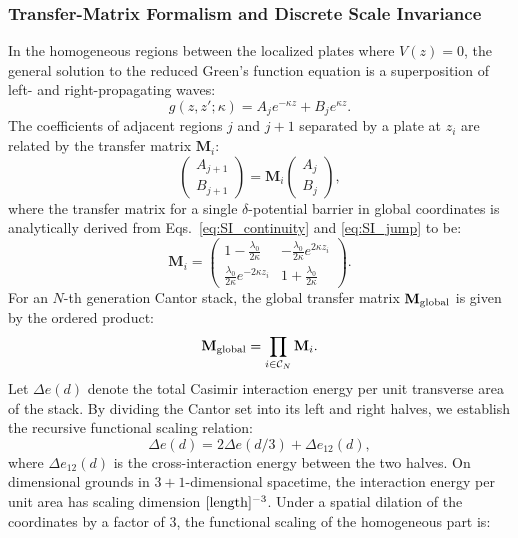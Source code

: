 \documentclass[12pt,letterpaper]{article}
\begin{document}
\subsubsection{Transfer-Matrix Formalism and Discrete Scale Invariance}
In the homogeneous regions between the localized plates where $V(z) = 0$, the general solution to the reduced Green's function equation is a superposition of left- and right-propagating waves:
\begin{equation}
g(z, z'; \kappa) = A_j e^{-\kappa z} + B_j e^{\kappa z}.
\label{eq:SI_wave}
\end{equation}
The coefficients of adjacent regions $j$ and $j+1$ separated by a plate at $z_i$ are related by the transfer matrix $\mathbf{M}_i$:
\begin{equation}
\begin{pmatrix} A_{j+1} \\ B_{j+1} \end{pmatrix} = \mathbf{M}_i \begin{pmatrix} A_j \\ B_j \end{pmatrix},
\label{eq:SI_transfer}
\end{equation}
where the transfer matrix for a single $\delta$-potential barrier in global coordinates is analytically derived from Eqs.~\eqref{eq:SI_continuity} and \eqref{eq:SI_jump} to be:
\begin{equation}
\mathbf{M}_i = \begin{pmatrix} 1 - \frac{\lambda_0}{2\kappa} & -\frac{\lambda_0}{2\kappa} e^{2\kappa z_i} \\ \frac{\lambda_0}{2\kappa} e^{-2\kappa z_i} & 1 + \frac{\lambda_0}{2\kappa} \end{pmatrix}.
\label{eq:SI_matrix}
\end{equation}
For an $N$-th generation Cantor stack, the global transfer matrix $\mathbf{M}_{\rm global}$ is given by the ordered product:
\begin{equation}
\mathbf{M}_{\rm global} = \prod_{i \in \mathcal{C}_N} \mathbf{M}_i.
\label{eq:SI_global_matrix}
\end{equation}
Let $\Delta e(d)$ denote the total Casimir interaction energy per unit transverse area of the stack. By dividing the Cantor set into its left and right halves, we establish the recursive functional scaling relation:
\begin{equation}
\Delta e(d) = 2 \Delta e(d/3) + \Delta e_{12}(d),
\label{eq:SI_recursion}
\end{equation}
where $\Delta e_{12}(d)$ is the cross-interaction energy between the two halves. On dimensional grounds in $3+1$-dimensional spacetime, the interaction energy per unit area has scaling dimension $[{\rm length}]^{-3}$. Under a spatial dilation of the coordinates by a factor of $3$, the functional scaling of the homogeneous part is:
\end{document}
